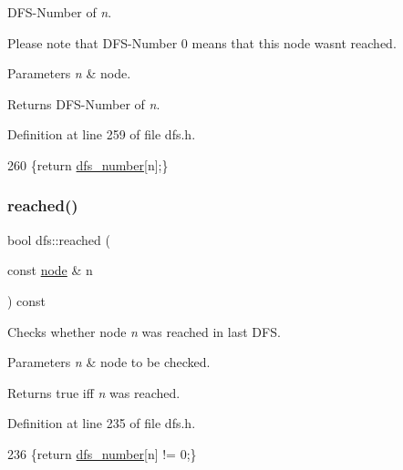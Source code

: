 D\+F\+S-\/\+Number of {\itshape n}. 

Please note that D\+F\+S-\/\+Number 0 means that this node wasn\textquotesingle{}t reached.


\begin{DoxyParams}{Parameters}
{\em n} & node. \\
\hline
\end{DoxyParams}
\begin{DoxyReturn}{Returns}
D\+F\+S-\/\+Number of {\itshape n}. 
\end{DoxyReturn}


Definition at line 259 of file dfs.\+h.


\begin{DoxyCode}
260     \{\textcolor{keywordflow}{return} \mbox{\hyperlink{classdfs_a99727f2274d6af63daae4f0518f3adbe}{dfs\_number}}[n];\}
\end{DoxyCode}
\mbox{\label{classdfs_a2948061eb1ea02f57614f9044c8e63cf}} 
\subsubsection{\texorpdfstring{reached()}{reached()}}
{\footnotesize\ttfamily bool dfs\+::reached (\begin{DoxyParamCaption}\item[{const \mbox{\hyperlink{classnode}{node}} \&}]{n }\end{DoxyParamCaption}) const\hspace{0.3cm}{\ttfamily [inline]}}



Checks whether node {\itshape n} was reached in last D\+FS. 


\begin{DoxyParams}{Parameters}
{\em n} & node to be checked. \\
\hline
\end{DoxyParams}
\begin{DoxyReturn}{Returns}
true iff {\itshape n} was reached. 
\end{DoxyReturn}


Definition at line 235 of file dfs.\+h.


\begin{DoxyCode}
236     \{\textcolor{keywordflow}{return} \mbox{\hyperlink{classdfs_a99727f2274d6af63daae4f0518f3adbe}{dfs\_number}}[n] != 0;\}
\end{DoxyCode}
\mbox{\label{classdfs_affaffda8be8418d6dbf396c5b1d6b81a}} 

